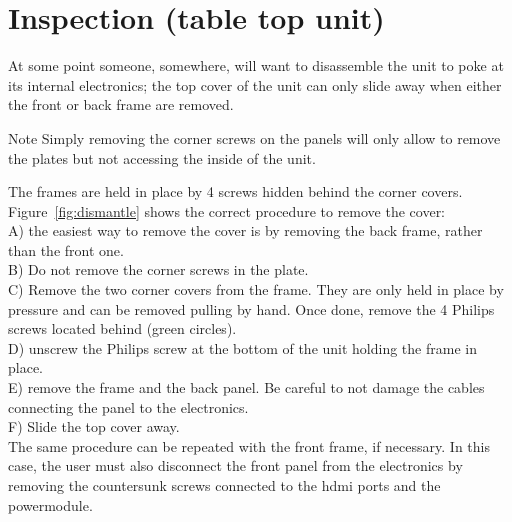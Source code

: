 \section{Inspection (table top unit)}\label{ch:inspection}
At some point someone, somewhere, will want to disassemble the unit to poke at its internal electronics; the top cover of the unit can only slide away when either the front or back frame are removed.
\begin{alertinfo}{Note}
    Simply removing the corner screws on the panels will only allow to remove the plates but not accessing the inside of the unit.
\end{alertinfo}
The frames are held in place by 4 screws hidden behind the corner covers.\\Figure~\ref{fig:dismantle} shows the correct procedure to remove the cover:\\
A) the easiest way to remove the cover is by removing the back frame, rather than the front one.\\
B) Do not remove the corner screws in the plate.\\
C) Remove the two corner covers from the frame. They are only held in place by pressure and can be removed pulling by hand. Once done, remove the 4 Philips screws located behind (green circles).\\
D) unscrew the Philips screw at the bottom of the unit holding the frame in place.\\
E) remove the frame and the back panel. Be careful to not damage the cables connecting the panel to the electronics.\\
F) Slide the top cover away.\\
The same procedure can be repeated with the front frame, if necessary. In this case, the user must also disconnect the front panel from the electronics by removing the countersunk screws connected to the \gls{hdmi} ports and the powermodule.
